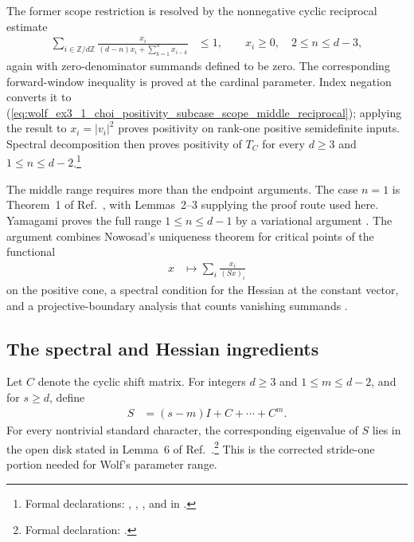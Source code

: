 \documentclass{article}
\begin{document}
The former scope restriction is resolved by the nonnegative cyclic reciprocal
estimate
\begin{align}
    \sum_{i\in\mathbb Z/d\mathbb Z}
        \frac{x_i}
        {(d-n)x_i+\sum_{k=1}^{n}x_{i-k}}
        &\leq 1,
    \qquad x_i\geq 0,\quad 2\leq n\leq d-3,
    \label{eq:wolf_ex3_1_choi_positivity_subcase_scope_middle_reciprocal}
\end{align}
again with zero-denominator summands defined to be zero. The corresponding
forward-window inequality is proved at the cardinal parameter. Index negation
converts it to
(\ref{eq:wolf_ex3_1_choi_positivity_subcase_scope_middle_reciprocal});
applying the result to $x_i=|v_i|^2$ proves positivity on rank-one positive
semidefinite inputs. Spectral decomposition then proves positivity of $T_C$
for every $d\geq 3$ and $1\leq n\leq d-2$.\footnote{Formal declarations:
,
,
, and
 in
.}

The middle range requires more than the endpoint arguments. The case $n=1$ is
Theorem~1 of
Ref.~\cite[pp.~309--311]{TanahashiTomiyama1988Indecomposable}, with
Lemmas~2--3 supplying the proof route used here. Yamagami proves the full
range $1\leq n\leq d-1$ by a variational argument
\cite{Yamagami1993Cyclic}. The argument combines Nowosad's uniqueness theorem
for critical points of the functional
\begin{align}
    x
        &\longmapsto
        \sum_i\frac{x_i}{(Sx)_i}
    \label{eq:wolf_ex3_1_choi_positivity_subcase_scope_variational_functional}
\end{align}
on the positive cone, a spectral condition for the Hessian at the constant
vector, and a projective-boundary analysis that counts vanishing summands
\cite{Nowosad1968Isoperimetric,Yamagami1993Cyclic}.

\subsection{The spectral and Hessian ingredients}

Let $C$ denote the cyclic shift matrix. For integers $d\geq 3$ and
$1\leq m\leq d-2$, and for $s\geq d$, define
\begin{align}
    S
        &=(s-m)I+C+\cdots+C^m.
    \label{eq:wolf_ex3_1_choi_positivity_subcase_scope_cyclic_matrix}
\end{align}
For every nontrivial standard character, the corresponding eigenvalue of $S$
lies in the open disk stated in Lemma~6 of
Ref.~\cite[pp.~523--524]{Yamagami1993Cyclic}.\footnote{Formal declaration:
.}
This is the corrected stride-one portion needed for Wolf's parameter range.
\end{document}
